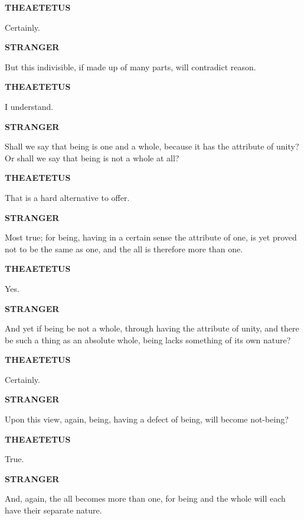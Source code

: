 \documentclass[11pt,letter]{article}
\begin{document}
\par \textbf{THEAETETUS}
\par   Certainly.

\par \textbf{STRANGER}
\par   But this indivisible, if made up of many parts, will contradict reason.

\par \textbf{THEAETETUS}
\par   I understand.

\par \textbf{STRANGER}
\par   Shall we say that being is one and a whole, because it has the attribute of unity? Or shall we say that being is not a whole at all?

\par \textbf{THEAETETUS}
\par   That is a hard alternative to offer.

\par \textbf{STRANGER}
\par   Most true; for being, having in a certain sense the attribute of one, is yet proved not to be the same as one, and the all is therefore more than one.

\par \textbf{THEAETETUS}
\par   Yes.

\par \textbf{STRANGER}
\par   And yet if being be not a whole, through having the attribute of unity, and there be such a thing as an absolute whole, being lacks something of its own nature?

\par \textbf{THEAETETUS}
\par   Certainly.

\par \textbf{STRANGER}
\par   Upon this view, again, being, having a defect of being, will become not-being?

\par \textbf{THEAETETUS}
\par   True.

\par \textbf{STRANGER}
\par   And, again, the all becomes more than one, for being and the whole will each have their separate nature.
\end{document}
